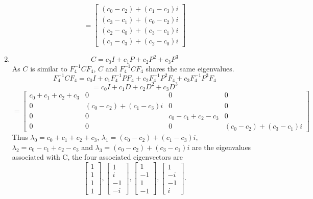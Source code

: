 \documentclass{article}
\begin{document}
\begin{enumerate}
\[=\left[\begin{array}{c}(c_0-c_2)+(c_1-c_3)i\\(c_3-c_1)+(c_0-c_2)i\\(c_2-c_0)+(c_3-c_1)i\\(c_1-c_3)+(c_2-c_0)i\end{array}\right]
\]
    \item 
    \[C=c_0I+c_1P+c_2P^2+c_3P^3\]
    As $C$ is similar to $F_4^{-1}CF_4$, $C$ and $F_4^{-1}CF_4$ shares the same eigenvalues.
    \[F_4^{-1}CF_4=c_0I+c_1F_4^{-1}PF_4+c_2F_4^{-1}P^2F_4+c_3F_4^{-1}P^3F_4\]
    \[=c_0I+c_1D+c_2D^2+c_3D^3
    \]\[=
    \left[\begin{array}{cccc}
 c_0+c_1+c_2+c_3 & 0                    & 0 & 0 \\
 0               & (c_0-c_2)+(c_1-c_3)i & 0 & 0 \\
 0               & 0                    & c_0-c_1+c_2-c_3 & 0 \\
 0               & 0                    & 0               & (c_0-c_2)+(c_3-c_1)i
\end{array}\right]\]
Thus $\lambda_0=c_0+c_1+c_2+c_3$,\newline
$\lambda_1=(c_0-c_2)+(c_1-c_3)i$,\newline
$\lambda_2=c_0-c_1+c_2-c_3$ and\newline
$\lambda_3=(c_0-c_2)+(c_3-c_1)i$ are the eigenvalues associated with C, the four associated eigenvectors are
\[
\left[\begin{array}{c}1\\1\\1\\1\end{array}\right],
\left[\begin{array}{c}1\\i\\-1\\-i\end{array}\right],
\left[\begin{array}{c}1\\-1\\1\\-1\end{array}\right],
\left[\begin{array}{c}1\\-i\\-1\\i\end{array}\right].
\]
\end{enumerate}
\end{document}
